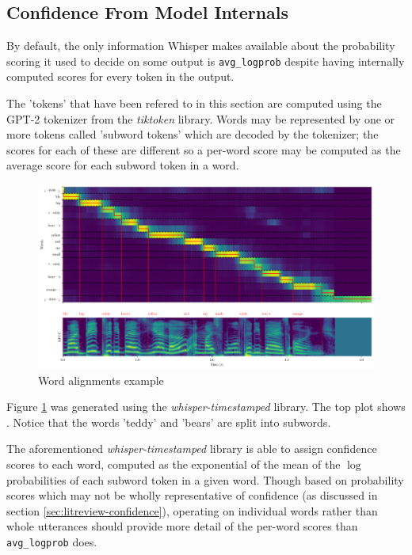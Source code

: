 \subsection{Confidence From Model Internals}

By default, the only information Whisper makes available about the probability scoring it used to decide on some output is \texttt{avg\_logprob} despite having internally computed scores for every token in the output.

The 'tokens' that have been refered to in this section are computed using the GPT-2 tokenizer from the \emph{tiktoken} library\cite{tiktoken}.
Words may be represented by one or more tokens called 'subword tokens' which are decoded by the tokenizer; the scores for each of these are different so a per-word score may be computed as the average score for each subword token in a word.

\begin{figure}[h]
  \centering
  \includegraphics[width=\textwidth]{images/mfcc-with-words.png}
  \caption{Word alignments example}
  \label{fig:word-alignments-example}
\end{figure}

Figure \ref{fig:word-alignments-example} was generated using the \emph{whisper-timestamped} library\cite{whisper-timestamped, whisper-ts-dtw-paper, whisper}.
The top plot shows \cite{whisper-timestamped}.
Notice that the words 'teddy' and 'bears' are split into subwords.

The aforementioned \emph{whisper-timestamped} library is able to assign confidence scores to each word, computed as the exponential of the mean of the $\log$ probabilities of each subword token in a given word.
Though based on probability scores which may not be wholly representative of confidence (as discussed in section \ref{sec:litreview-confidence}), operating on individual words rather than whole utterances should provide more detail of the per-word scores than \texttt{avg\_logprob} does.

